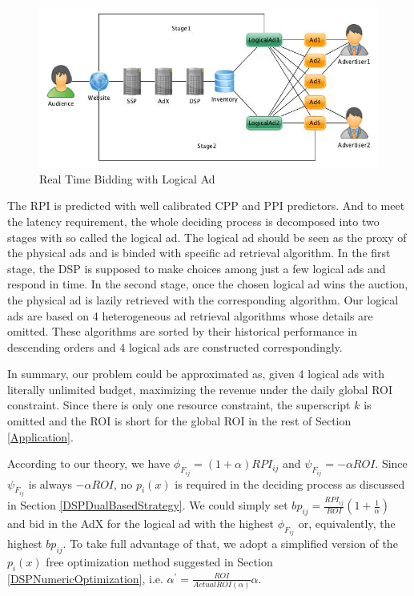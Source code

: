 \documentclass{article}
\newcommand{\sbp}{bp_{ij}}
\newcommand{\sCPI}{RPI_{ij}}
\newcommand{\sF}{F_{ij}}
\newcommand{\pprob}{\phi}
\newcommand{\pcost}{\psi}
\newcommand{\dbbp}{\frac{\sCPI}{ROI}(1+\frac{1}{\alpha})}
\newcommand{\dbiter}{\alpha^{'} = \frac{ROI}{ActualROI(\alpha)}\alpha}
\begin{document}
\begin{figure}[!h]
\centering
\includegraphics[width=1.0\linewidth]{./LogicalAd.jpg}
\caption{Real Time Bidding with Logical Ad}
\end{figure}

The RPI is predicted with well calibrated CPP and PPI predictors.
And to meet the latency requirement, the whole deciding process is decomposed into two stages with so called the logical ad.
The logical ad should be seen as the proxy of the physical ads and is binded with specific ad retrieval algorithm.
In the first stage, the DSP is supposed to make choices among just a few logical ads and respond in time.
In the second stage, once the chosen logical ad wins the auction, the physical ad is lazily retrieved with the corresponding algorithm.
Our logical ads are based on 4 heterogeneous ad retrieval algorithms whose details are omitted.
These algorithms are sorted by their historical performance in descending orders and 4 logical ads are constructed correspondingly.

In summary, our problem could be approximated as, given 4 logical ads with literally unlimited budget,
    maximizing the revenue under the daily global ROI constraint.
Since there is only one resource constraint, the superscript $k$ is omitted and
    the ROI is short for the global ROI in the rest of Section \ref{Application}.

According to our theory, we have $\pprob_{\sF}=(1+\alpha)\sCPI$ and $\pcost_{\sF}=-\alpha{}ROI$.
Since $\pcost_{\sF}$ is always $-\alpha{}ROI$, no $p_i(x)$ is required in the deciding process as discussed in Section \ref{DSPDualBasedStrategy}.
We could simply set $\sbp = \dbbp$ and bid in the AdX for the logical ad
    with the highest $\pprob_{\sF}$ or, equivalently, the highest $\sbp$.
To take full advantage of that, we adopt a simplified version of the $p_i(x)$ free optimization method
    suggested in Section \ref{DSPNumericOptimization}, i.e. $\dbiter$.
\end{document}
